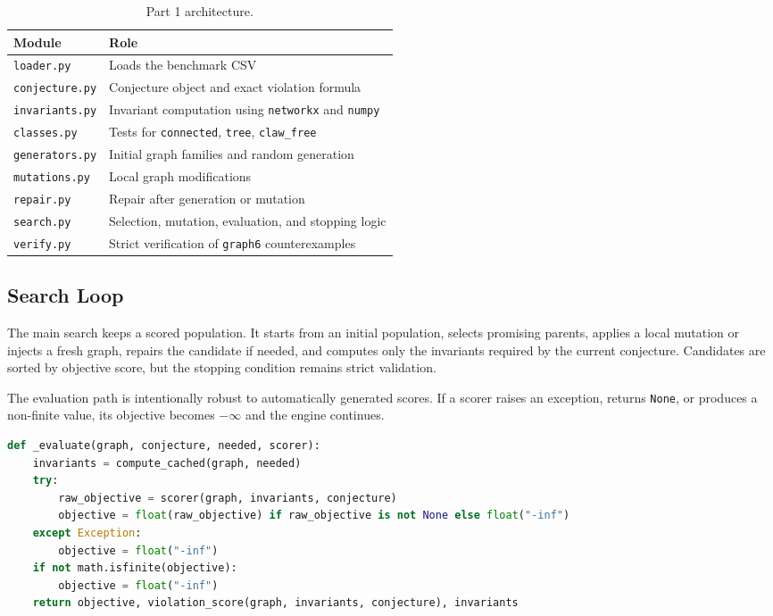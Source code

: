 \documentclass[11pt,a4paper]{article}
\begin{document}
\begin{table}[H]
\centering
\begin{tabular}{ll}
\toprule
Module & Role \\
\midrule
\texttt{loader.py} & Loads the benchmark CSV \\
\texttt{conjecture.py} & Conjecture object and exact violation formula \\
\texttt{invariants.py} & Invariant computation using \texttt{networkx} and \texttt{numpy} \\
\texttt{classes.py} & Tests for \texttt{connected}, \texttt{tree}, \texttt{claw\_free} \\
\texttt{generators.py} & Initial graph families and random generation \\
\texttt{mutations.py} & Local graph modifications \\
\texttt{repair.py} & Repair after generation or mutation \\
\texttt{search.py} & Selection, mutation, evaluation, and stopping logic \\
\texttt{verify.py} & Strict verification of \texttt{graph6} counterexamples \\
\bottomrule
\end{tabular}
\caption{Part 1 architecture.}
\end{table}

\subsection{Search Loop}

The main search keeps a scored population. It starts from an initial population, selects promising parents, applies a local mutation or injects a fresh graph, repairs the candidate if needed, and computes only the invariants required by the current conjecture. Candidates are sorted by objective score, but the stopping condition remains strict validation.

The evaluation path is intentionally robust to automatically generated scores. If a scorer raises an exception, returns \texttt{None}, or produces a non-finite value, its objective becomes \(-\infty\) and the engine continues.

\begin{lstlisting}[language=Python,caption={Candidate evaluation in the search engine.}]
def _evaluate(graph, conjecture, needed, scorer):
    invariants = compute_cached(graph, needed)
    try:
        raw_objective = scorer(graph, invariants, conjecture)
        objective = float(raw_objective) if raw_objective is not None else float("-inf")
    except Exception:
        objective = float("-inf")
    if not math.isfinite(objective):
        objective = float("-inf")
    return objective, violation_score(graph, invariants, conjecture), invariants
\end{lstlisting}
\end{document}
